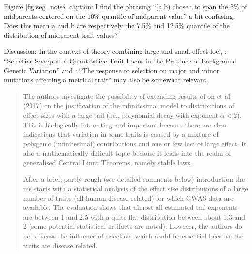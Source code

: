 \begin{point}{}
    Figure \ref{fig:seg_noise} caption: I find the phrasing ``(a,b) chosen to span the 5\% of midparents centered on the 10\% quantile of midparent value'' a bit confusing. Does this mean a and b are respectively the 7.5\% and 12.5\% quantile of the distribution of midparent trait values?
\end{point}


\begin{point}{}
    Discussion: In the context of theory combining large and small-effect loci, \citet{chevin2008selective}: ``Selective Sweep at a Quantitative Trait Locus in the Presence of Background Genetic Variation'' and \citet{lande1983response}: ``The response to selection on major and minor mutations affecting a metrical trait'' may also be somewhat relevant.
\end{point}



\begin{quote}
The authors investigate the possibility of extending results of \citet{barton2017infinitesimal} on et al (2017) on the
justification of the infinitesimal model to distributions of effect sizes with a large tail (i.e.,
polynomial decay with exponent $\alpha < 2$). This is biologically interesting and important
because there are clear indications that variation in some traits is caused by a mixture
of polygenic (infinitesimal) contributions and one or few loci of large effect. It also a
mathematically difficult topic because it leads into the realm of generalized Central Limit
Theorems, namely stable laws.

After a brief, partly rough (see detailed comments below) introduction the ms starts with
a statistical analysis of the effect size distributions of a large number of traits (all human
disease related) for which GWAS data are available. The evaluation shows that almost
all estimated tail exponents are between 1 and 2.5 with a quite flat distribution between
about 1.3 and 2 (some potential statistical artifacts are noted). However, the authors do
not discuss the influence of selection, which could be essential because the traits are disease
related.
\end{quote}

